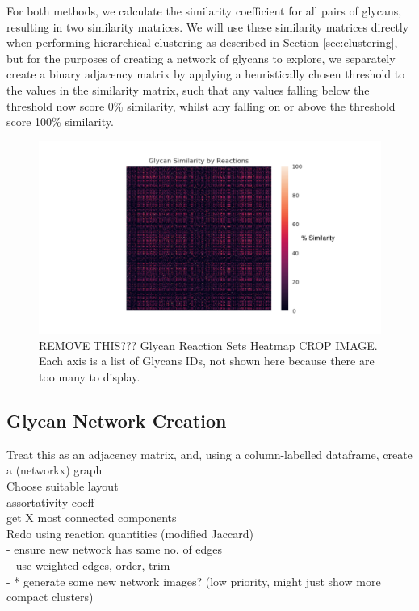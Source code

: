 \documentclass[12pt,a4paper]{article}
\begin{document}
For both methods, we calculate the similarity coefficient for all pairs of glycans, resulting in two similarity matrices. We will use these similarity matrices directly when performing hierarchical clustering as described in Section \ref{sec:clustering}, but for the purposes of creating a network of glycans to explore, we separately create a binary adjacency matrix by applying a heuristically chosen threshold to the values in the similarity matrix, such that any values falling below the threshold now score 0\% similarity, whilst any falling on or above the threshold score 100\% similarity.

\begin{figure}[H]
\centering 
\includegraphics[scale=0.5]{images/heatmap_set_method.pdf} 
\caption{REMOVE THIS??? Glycan Reaction Sets Heatmap CROP IMAGE. Each axis is a list of Glycans IDs, not shown here because there are too many to display.}
\label{fig:heatmap_set_method}
\end{figure}

\subsection{Glycan Network Creation}
\label{sec:network_creation}

Treat this as an adjacency matrix, and, using a column-labelled dataframe, create a (networkx) graph\\

Choose suitable layout\\

assortativity coeff\\

get X most connected components \\

Redo using reaction quantities (modified Jaccard)\\
- ensure new network has same no. of edges\\
-- use weighted edges, order, trim\\
- * generate some new network images? (low priority, might just show more compact clusters) \\
\end{document}
